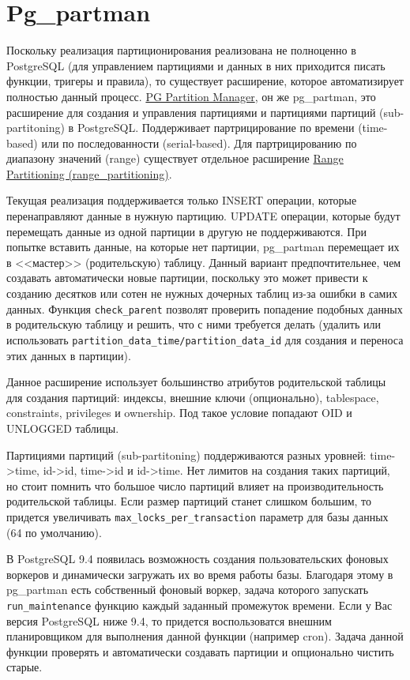 \section{Pg\_partman}

Поскольку реализация партиционирования реализована не полноценно в PostgreSQL (для управлением партициями и данных в них приходится писать функции, тригеры и правила), то существует расширение, которое автоматизирует полностью данный процесс. \href{https://github.com/keithf4/pg\_partman}{PG Partition Manager}, он же pg\_partman, это расширение для создания и управления партициями и партициями партиций (sub-partitoning) в PostgreSQL. Поддерживает партрицирование по времени (time-based) или по последованности (serial-based). Для партрицированию по диапазону значений (range) существует отдельное расширение \href{https://github.com/moat/range\_partitioning}{Range Partitioning (range\_partitioning)}.

Текущая реализация поддерживается только INSERT операции, которые перенаправляют данные в нужную партицию. UPDATE операции, которые будут перемещать данные из одной партиции в другую не поддерживаются. При попытке вставить данные, на которые нет партиции, pg\_partman перемещает их в <<мастер>> (родительскую) таблицу. Данный вариант предпочтительнее, чем создавать автоматически новые партиции, поскольку это может привести к созданию десятков или сотен не нужных дочерных таблиц из-за ошибки в самих данных. Функция \lstinline!check_parent! позволят проверить попадение подобных данных в родительскую таблицу и решить, что с ними требуется делать (удалить или использовать \lstinline!partition_data_time/partition_data_id! для создания и переноса этих данных в партиции).

Данное расширение использует большинство атрибутов родительской таблицы для создания партиций: индексы, внешние ключи (опционально), tablespace, constraints, privileges и ownership. Под такое условие попадают OID и UNLOGGED таблицы.

Партициями партиций (sub-partitoning) поддерживаются разных уровней: time->time, id->id, time->id и id->time. Нет лимитов на создания таких партиций, но стоит помнить что большое число партиций влияет на производительность родительской таблицы. Если размер партиций станет слишком большим, то придется увеличивать \lstinline!max_locks_per_transaction! параметр для базы данных (64 по умолчанию).

В PostgreSQL 9.4 появилась возможность создания пользовательских фоновых воркеров и динамически загружать их во время работы базы. Благодаря этому в pg\_partman есть собственный фоновый воркер, задача которого запускать \lstinline!run_maintenance! функцию каждый заданный промежуток времени. Если у Вас версия PostgreSQL ниже 9.4, то придется воспользоватся внешним планировщиком для выполнения данной функции (например cron). Задача данной функции проверять и автоматически создавать партиции и опционально чистить старые.

